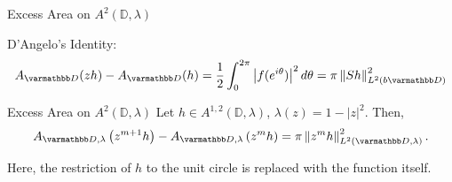 \documentclass{reu_beamer}
\begin{document}
\begin{frame}{Excess Area on $A^2(\mathbb{D},\lambda)$}
    \begin{center}
        \small
        D'Angelo's Identity: 
        \[A_{\mathbb{D}}(zh) - A_{\mathbb{D}}(h) = \frac{1}{2}\int_0^{2\pi}\left|f(e^{i\theta})\right|^2d\theta = \pi \norm{Sh}_{L^{2}(b\mathbb{D})}^2\]
    \end{center}
\begin{block}{Excess Area on $A^{2}(\mathbb{D},\lambda)$}
    Let $h\in A^{1,2}(\mathbb{D},\lambda)$, $\lambda(z) = 1-|z|^2$. Then,
    \[ A_{\disc, \lambda}\left(z^{m+1}h\right)-A_{\disc, \lambda}\left(z^{m}h\right)=\pi\norm{z^mh}^2_{L^2(\mathbb{D},\lambda)}.\]
\end{block}
    Here, the restriction of $h$ to the unit circle is replaced with the function itself.
\end{frame}
%        
\end{document}

